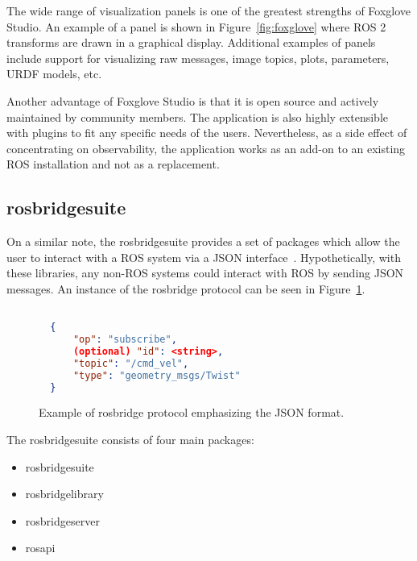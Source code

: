         The wide range of visualization panels is one of the greatest strengths of Foxglove Studio. An example of a panel is shown in Figure~\ref{fig:foxglove} where \ac{ROS} 2 transforms are drawn in a graphical display. Additional examples of panels include support for visualizing raw messages, image topics, plots, parameters, \ac{URDF} models, etc.

        Another advantage of Foxglove Studio is that it is open source and actively maintained by community members. The application is also highly extensible with plugins to fit any specific needs of the users. Nevertheless, as a side effect of concentrating on observability, the application works as an add-on to an existing ROS installation and not as a replacement.

    \subsection{rosbridge\smallunderscore suite}

        On a similar note, the \textsf{rosbridge\smallunderscore suite} provides a set of packages which allow the user to interact with a \ac{ROS} system via a \ac{JSON} interface~\cite{rosbridge}. Hypothetically, with these libraries, any non-ROS systems could interact with ROS by sending \ac{JSON} messages. An instance of the \textsf{rosbridge} protocol can be seen in Figure~\ref{fig:rosbridge}.

        \begin{figure}[htbp]
            \centering
            \begin{lstlisting}[language=JSON]

  {
      "op": "subscribe",
      (optional) "id": <string>,
      "topic": "/cmd_vel",
      "type": "geometry_msgs/Twist"
  }
            \end{lstlisting}
            \caption{Example of \textsf{rosbridge} protocol emphasizing the JSON format.}
            \label{fig:rosbridge}
        \end{figure}

        The \textsf{rosbridge\smallunderscore suite} consists of four main packages:

        \begin{itemize}
            \item \textsf{rosbridge\smallunderscore suite}
            \item \textsf{rosbridge\smallunderscore library}
            \item \textsf{rosbridge\smallunderscore server}
            \item \textsf{rosapi}
        \end{itemize}

